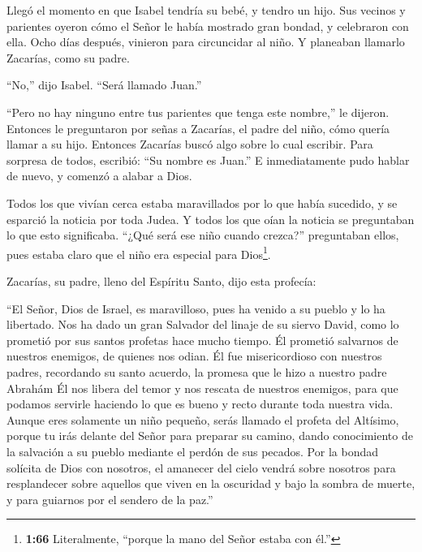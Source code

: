  Llegó el momento en que Isabel tendría su bebé, y tendro
un hijo.  Sus vecinos y parientes oyeron cómo el Señor le
había mostrado gran bondad, y celebraron con ella.  Ocho
días después, vinieron para circuncidar al niño. Y planeaban llamarlo
Zacarías, como su padre.

 ``No,'' dijo Isabel. ``Será llamado Juan.''

 ``Pero no hay ninguno entre tus parientes que tenga este
nombre,'' le dijeron.  Entonces le preguntaron por señas a
Zacarías, el padre del niño, cómo quería llamar a su hijo. 
Entonces Zacarías buscó algo sobre lo cual escribir. Para sorpresa de
todos, escribió: ``Su nombre es Juan.''  E inmediatamente
pudo hablar de nuevo, y comenzó a alabar a Dios.

 Todos los que vivían cerca estaba maravillados por lo que
había sucedido, y se esparció la noticia por toda Judea.  Y
todos los que oían la noticia se preguntaban lo que esto significaba.
``¿Qué será ese niño cuando crezca?'' preguntaban ellos, pues estaba
claro que el niño era especial para Dios\footnote{\textbf{1:66}
  Literalmente, ``porque la mano del Señor estaba con él.''}.

 Zacarías, su padre, lleno del Espíritu Santo, dijo esta
profecía:

 ``El Señor, Dios de Israel, es maravilloso, pues ha venido
a su pueblo y lo ha libertado.  Nos ha dado un gran
Salvador del linaje de su siervo David,  como lo prometió
por sus santos profetas hace mucho tiempo.  Él prometió
salvarnos de nuestros enemigos, de quienes nos odian.  Él
fue misericordioso con nuestros padres, recordando su santo acuerdo,
 la promesa que le hizo a nuestro padre Abrahám
 Él nos libera del temor y nos rescata de nuestros
enemigos,  para que podamos servirle haciendo lo que es
bueno y recto durante toda nuestra vida.  Aunque eres
solamente un niño pequeño, serás llamado el profeta del Altísimo, porque
tu irás delante del Señor para preparar su camino,  dando
conocimiento de la salvación a su pueblo mediante el perdón de sus
pecados.  Por la bondad solícita de Dios con nosotros, el
amanecer del cielo vendrá sobre nosotros  para resplandecer
sobre aquellos que viven en la oscuridad y bajo la sombra de muerte, y
para guiarnos por el sendero de la paz.''

